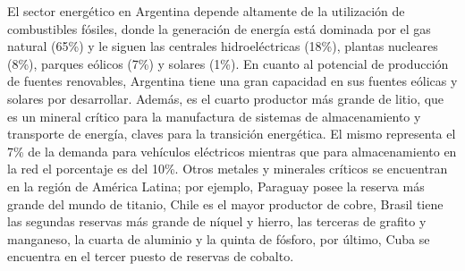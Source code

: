 El sector energético en Argentina depende altamente de la utilización de 
combustibles fósiles, donde la generación de energía está dominada por el gas 
natural (65\%) y le siguen las centrales hidroeléctricas (18\%), plantas nucleares
(8\%), parques eólicos (7\%) y solares (1\%). En cuanto al potencial de 
producción de fuentes renovables, Argentina tiene una gran capacidad en sus 
fuentes eólicas y solares por desarrollar. Además, es el cuarto productor más 
grande de litio, que es un mineral crítico para la manufactura de sistemas de 
almacenamiento y transporte de energía, claves para la transición energética. 
El mismo representa el 7\% de la demanda para vehículos eléctricos mientras que 
para almacenamiento en la red el porcentaje es del 10\%. Otros metales y 
minerales críticos se encuentran en la región de América Latina; por ejemplo, 
Paraguay posee la reserva más grande del mundo de titanio, Chile es el mayor 
productor de cobre, Brasil tiene las segundas reservas más grande de níquel y
hierro, las terceras de grafito y manganeso, la cuarta de aluminio y la quinta de 
fósforo, por último, Cuba se encuentra en el tercer puesto de reservas de cobalto.

